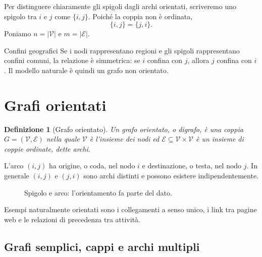 \documentclass[11pt,a4paper]{article}
\newtheorem{definition}{Definizione}[section]
\newcommand{\V}{\mathcal{V}}
\newcommand{\E}{\mathcal{E}}
\begin{document}
Per distinguere chiaramente gli spigoli dagli archi orientati, scriveremo uno spigolo tra $i$ e $j$ come $\{i,j\}$. Poiché la coppia non è ordinata,
\[
\{i,j\}=\{j,i\}.
\]
Poniamo $n=|\V|$ e $m=|\E|$.

\begin{examplebox}{Confini geografici}
Se i nodi rappresentano regioni e gli spigoli rappresentano confini comuni, la relazione è simmetrica: se $i$ confina con $j$, allora $j$ confina con $i$. Il modello naturale è quindi un grafo non orientato.
\end{examplebox}

\section{Grafi orientati}

\begin{definition}[Grafo orientato]
Un grafo orientato, o digrafo, è una coppia $G=(\V,\E)$ nella quale $\V$ è l'insieme dei nodi ed $\E\subseteq\V\times\V$ è un insieme di coppie ordinate, dette \emph{archi}.
\end{definition}

L'arco $(i,j)$ ha origine, o coda, nel nodo $i$ e destinazione, o testa, nel nodo $j$. In generale $(i,j)$ e $(j,i)$ sono archi distinti e possono esistere indipendentemente.

\begin{figure}[ht]
\centering
{}
\caption{Spigolo e arco: l'orientamento fa parte del dato.}
\end{figure}

Esempi naturalmente orientati sono i collegamenti a senso unico, i link tra pagine web e le relazioni di precedenza tra attività.

\subsection{Grafi semplici, cappi e archi multipli}
\end{document}
